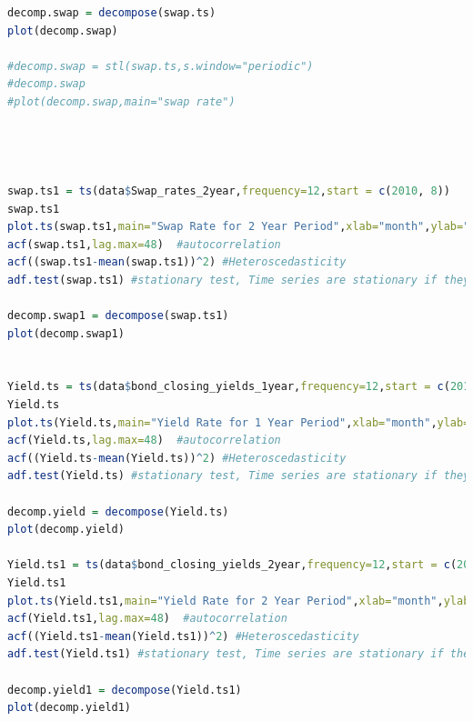 \documentclass[10pt]{article}
\begin{document}
\begin{lstlisting}[language=R]
decomp.swap = decompose(swap.ts)
plot(decomp.swap)

#decomp.swap = stl(swap.ts,s.window="periodic")
#decomp.swap
#plot(decomp.swap,main="swap rate")




swap.ts1 = ts(data$Swap_rates_2year,frequency=12,start = c(2010, 8))
swap.ts1
plot.ts(swap.ts1,main="Swap Rate for 2 Year Period",xlab="month",ylab="swap rate in percent",frequency=12,start = c(2010, 8))
acf(swap.ts1,lag.max=48)  #autocorrelation
acf((swap.ts1-mean(swap.ts1))^2) #Heteroscedasticity 
adf.test(swap.ts1) #stationary test, Time series are stationary if they do not have trend or seasonal effects, p-value is obtained is greater than significance level of 0.05 and the ADF statistic is higher than any of the critical values. Clearly, there is no reason to reject the null hypothesis. So, the time series is in fact non-stationary.

decomp.swap1 = decompose(swap.ts1)
plot(decomp.swap1)


Yield.ts = ts(data$bond_closing_yields_1year,frequency=12,start = c(2010, 8))
Yield.ts
plot.ts(Yield.ts,main="Yield Rate for 1 Year Period",xlab="month",ylab="yield rate in percent",frequency=12,start = c(2010, 8))
acf(Yield.ts,lag.max=48)  #autocorrelation
acf((Yield.ts-mean(Yield.ts))^2) #Heteroscedasticity 
adf.test(Yield.ts) #stationary test, Time series are stationary if they do not have trend or seasonal effects, p-value is obtained is greater than significance level of 0.05 and the ADF statistic is higher than any of the critical values. Clearly, there is no reason to reject the null hypothesis. So, the time series is in fact non-stationary.

decomp.yield = decompose(Yield.ts)
plot(decomp.yield)

Yield.ts1 = ts(data$bond_closing_yields_2year,frequency=12,start = c(2010, 8))
Yield.ts1
plot.ts(Yield.ts1,main="Yield Rate for 2 Year Period",xlab="month",ylab="yield rate in percent",frequency=12,start = c(2010, 8))
acf(Yield.ts1,lag.max=48)  #autocorrelation
acf((Yield.ts1-mean(Yield.ts1))^2) #Heteroscedasticity 
adf.test(Yield.ts1) #stationary test, Time series are stationary if they do not have trend or seasonal effects, p-value is obtained is greater than significance level of 0.05 and the ADF statistic is higher than any of the critical values. Clearly, there is no reason to reject the null hypothesis. So, the time series is in fact non-stationary.

decomp.yield1 = decompose(Yield.ts1)
plot(decomp.yield1)




\end{lstlisting}
\end{document}
